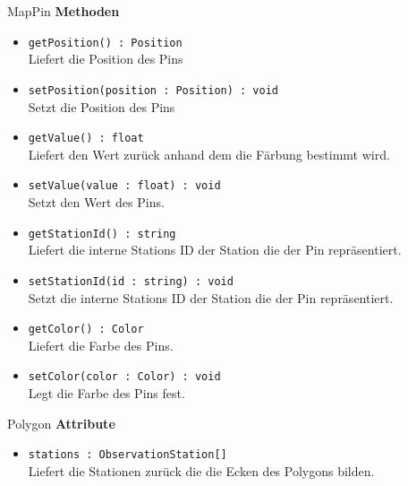 \begin{Class}{MapPin}
    \textbf{Methoden}
    \begin{itemize}
        \item \texttt{getPosition() : Position}
        \\ Liefert die Position des Pins
        \item \texttt{setPosition(position : Position) : void}
        \\ Setzt die Position des Pins

        \bigskip
        \item \texttt{getValue() : float}
        \\ Liefert den Wert zurück anhand dem die Färbung bestimmt wird.
        \item \texttt{setValue(value : float) : void}
        \\ Setzt den Wert des Pins.

        \bigskip
        \item \texttt{getStationId() : string}
        \\ Liefert die interne Stations ID der Station die der Pin repräsentiert.
        \item \texttt{setStationId(id : string) : void}
        \\ Setzt die interne Stations ID der Station die der Pin repräsentiert.

        \bigskip
        \item \texttt{getColor() : Color}
        \\ Liefert die Farbe des Pins.
        \item \texttt{setColor(color : Color) : void}
        \\ Legt die Farbe des Pins fest.
    \end{itemize}
\end{Class}

\begin{Class}{Polygon}
    \textbf{Attribute}
    \begin{itemize}
        \item \texttt{stations : ObservationStation[]}
        \\ Liefert die Stationen zurück die die Ecken des Polygons bilden.
    \end{itemize}
\end{Class}
